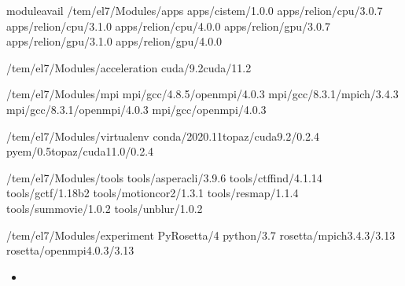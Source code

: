 \documentclass[a4paper,10pt,english]{sphinxmanual}
\begin{document}
\begin{sphinxVerbatim}[commandchars=\\\{\}]
\PYGZdl{}\PYGZgt{}moduleavail
\PYGZhy{}\PYGZhy{}\PYGZhy{}\PYGZhy{}\PYGZhy{}\PYGZhy{}\PYGZhy{}\PYGZhy{}/tem/el7/Modules/apps\PYGZhy{}\PYGZhy{}\PYGZhy{}\PYGZhy{}\PYGZhy{}\PYGZhy{}\PYGZhy{}\PYGZhy{}
apps/cistem/1.0.0
apps/relion/cpu/3.0.7
apps/relion/cpu/3.1.0
apps/relion/cpu/4.0.0
apps/relion/gpu/3.0.7
apps/relion/gpu/3.1.0
apps/relion/gpu/4.0.0

\PYGZhy{}\PYGZhy{}\PYGZhy{}\PYGZhy{}/tem/el7/Modules/acceleration\PYGZhy{}\PYGZhy{}\PYGZhy{}\PYGZhy{}
cuda/9.2cuda/11.2

\PYGZhy{}\PYGZhy{}\PYGZhy{}\PYGZhy{}\PYGZhy{}\PYGZhy{}\PYGZhy{}\PYGZhy{}/tem/el7/Modules/mpi\PYGZhy{}\PYGZhy{}\PYGZhy{}\PYGZhy{}\PYGZhy{}\PYGZhy{}\PYGZhy{}\PYGZhy{}\PYGZhy{}
mpi/gcc/4.8.5/openmpi/4.0.3
mpi/gcc/8.3.1/mpich/3.4.3
mpi/gcc/8.3.1/openmpi/4.0.3
mpi/gcc/openmpi/4.0.3

\PYGZhy{}\PYGZhy{}\PYGZhy{}\PYGZhy{}\PYGZhy{}/tem/el7/Modules/virtualenv\PYGZhy{}\PYGZhy{}\PYGZhy{}\PYGZhy{}\PYGZhy{}
conda/2020.11topaz/cuda\PYGZhy{}9.2/0.2.4
pyem/0.5topaz/cuda\PYGZhy{}11.0/0.2.4

\PYGZhy{}\PYGZhy{}\PYGZhy{}\PYGZhy{}\PYGZhy{}\PYGZhy{}\PYGZhy{}/tem/el7/Modules/tools\PYGZhy{}\PYGZhy{}\PYGZhy{}\PYGZhy{}\PYGZhy{}\PYGZhy{}\PYGZhy{}\PYGZhy{}
tools/aspera\PYGZhy{}cli/3.9.6
tools/ctffind/4.1.14
tools/gctf/1.18\PYGZus{}b2
tools/motioncor2/1.3.1
tools/resmap/1.1.4
tools/summovie/1.0.2
tools/unblur/1.0.2

\PYGZhy{}\PYGZhy{}\PYGZhy{}\PYGZhy{}\PYGZhy{}/tem/el7/Modules/experiment\PYGZhy{}\PYGZhy{}\PYGZhy{}\PYGZhy{}\PYGZhy{}
PyRosetta/4
python/3.7
rosetta/mpich\PYGZhy{}3.4.3/3.13
rosetta/openmpi\PYGZhy{}4.0.3/3.13
\end{sphinxVerbatim}
\begin{itemize}
\item {} 
\sphinxAtStartPar
{}

\end{itemize}
\end{document}
